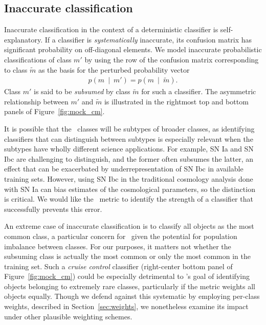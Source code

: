 \subsection{Inaccurate classification}
\label{sec:inaccuratedata}

Inaccurate classification in the context of a deterministic classifier is self-explanatory.
If a classifier is \textit{systematically} inaccurate, its confusion matrix has significant probability on off-diagonal elements.
We model inaccurate probabilistic classifications of class $m'$ by using the row of the confusion matrix corresponding to class $\tilde{m}$ as the basis for the perturbed probability vector
\begin{eqnarray}
  \label{eq:subsume}
  p(m\ \mid\ m') = p(m\ \mid\ \tilde{m}).
\end{eqnarray}
Class $m'$ is said to be \textit{subsumed} by class $\tilde{m}$ for such a classifier.
The asymmetric relationship between $m'$ and $\tilde{m}$ is illustrated in the rightmost top and bottom panels of Figure~\ref{fig:mock_cm}.

It is possible that the \plasticc\ classes will be subtypes of broader classes, as identifying classifiers that can distinguish between subtypes is especially relevant when the subtypes have wholly different science applications.
For example, SN Ia and SN Ibc are challenging to distinguish, and the former often subsumes the latter, an effect that can be exacerbated by underrepresentation of SN Ibc in available training sets.
However, using SN Ibc in the traditional cosmology analysis done with SN Ia can bias estimates of the cosmological parameters, so the distinction is critical.
We would like the \plasticc\ metric to identify the strength of a classifier that successfully prevents this error.

An extreme case of inaccurate classification is to classify all objects as the most common class, a particular concern for \plasticc\ given the potential for population imbalance between classes.
For our purposes, it matters not whether the subsuming class is actually the most common or only the most common in the training set.
Such a \textit{cruise control} classifier (right-center bottom panel of Figure~\ref{fig:mock_cm}) could be especially detrimental to \plasticc's goal of identifying objects belonging to extremely rare classes, particularly if the metric weights all objects equally.
Though we defend against this systematic by employing per-class weights, described in Section~\ref{sec:weights}, we nonetheless examine its impact under other plausible weighting schemes.

